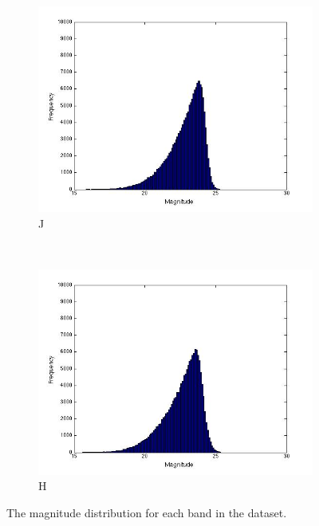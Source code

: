 \documentclass[useAMS,usenatbib,fleqn]{mn2e}
\begin{document}
\begin{figure}
\begin{subfigure}[b]{0.2\textwidth}
                \includegraphics[trim = 35px 15px 50px 25px, clip=true,width=\textwidth]{figures/J.jpg}
                \caption{J}
        \end{subfigure}
         ~
        \begin{subfigure}[b]{0.2\textwidth}
                \includegraphics[trim = 35px 15px 50px 25px, clip=true,width=\textwidth]{figures/H.jpg}
                \caption{H}
        \end{subfigure}
        
       \caption{The magnitude distribution for each band in the dataset.} 
	\label{fig-bands-histograms}
\end{figure}
\end{document}
